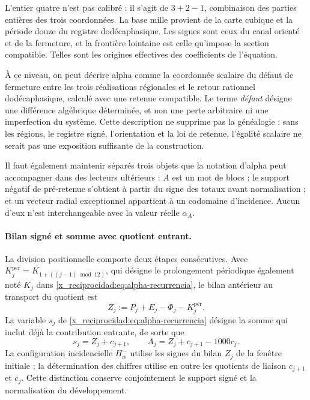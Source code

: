 L'entier quatre n'est pas calibré : il s'agit de
\(3+2-1\), combinaison des parties entières des trois coordonnées.
La base mille provient de la carte cubique et la période douze du registre dodécaphasique. Les
signes sont ceux du canal orienté et de la fermeture, et la frontière lointaine est
celle qu'impose la section compatible. Telles sont les origines effectives
des coefficients de l'équation.

À ce niveau, on peut décrire alpha comme la coordonnée scalaire du défaut de fermeture entre les trois réalisations régionales et le retour rationnel dodécaphasique, calculé avec une retenue compatible. Le terme \emph{défaut} désigne une différence algébrique déterminée, et non une perte arbitraire ni une imperfection du système. Cette description ne supprime pas la généalogie : sans les régions, le registre signé, l'orientation et la loi de retenue, l'égalité scalaire ne serait pas une exposition suffisante de la construction.

Il faut également maintenir séparés trois objets que la notation d'alpha peut accompagner dans des lecteurs ultérieurs : \(A\) est un mot de blocs ; le support négatif de pré-retenue s'obtient à partir du signe des totaux avant normalisation ; et un vecteur radial exceptionnel appartient à un codomaine d'incidence. Aucun d'eux n'est interchangeable avec la valeur réelle \(\alpha_A\).


\paragraph{Bilan signé et somme avec quotient entrant.}
\label{x_reciprocidad:ampl-alfa-z-s-aclaracion}
La division positionnelle comporte deux étapes consécutives. Avec
\(K_j^{\mathrm{per}}=K_{1+((j-1)\bmod12)}\), qui désigne le
prolongement périodique également noté \(K_j\) dans
\eqref{x_reciprocidad:eq:alpha-recurrencia}, le bilan antérieur au transport du
quotient est
\[
 Z_j:=P_j+E_j-\Phi_j-K_j^{\mathrm{per}}.
\]
La variable $s_j$ de \eqref{x_reciprocidad:eq:alpha-recurrencia} désigne la somme qui
inclut déjà la contribution entrante, de sorte que
\[
 s_j=Z_j+c_{j+1},\qquad
 A_j=Z_j+c_{j+1}-1000c_j.
\]
La configuration incidencielle
$H^-_\alpha$ utilise les signes du bilan $Z_j$ de la fenêtre initiale ;
la détermination des chiffres utilise en outre les quotients de liaison
$c_{j+1}$ et $c_j$. Cette distinction conserve conjointement le support
signé et la normalisation du développement.

